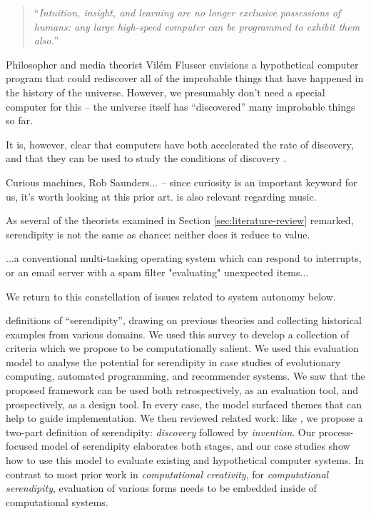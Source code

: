 \begin{quote}
``\emph{Intuition, insight, and learning are no longer exclusive possessions of humans: any large high-speed computer can be programmed to exhibit them also.}'' \cite[p.~6]{simon1958heuristic}
\end{quote}

Philosopher and media theorist Vil\'em Flusser
\cite[p.~10]{flusser2011into} envisions a hypothetical computer
program that could rediscover all of the improbable things that have
happened in the history of the universe.
However, we presumably don't need a special computer for this -- the
universe itself has ``discovered'' many improbable things so far.

It is, however, clear
that computers have both accelerated the rate of discovery, and that
they can be used to study the conditions of discovery
\cite{arbesman2011eurekometrics}.

Curious machines, Rob Saunders... -- since curiosity is an important
keyword for us, it's worth looking at this prior art.
\cite{manaris2003evolutionary} is also relevant regarding music.

As several of the theorists examined in Section
\ref{sec:literature-review} remarked, serendipity is not the same as
chance: neither does it reduce to value.

...a conventional multi-tasking operating system which can respond to interrupts, or an email server with a spam filter "evaluating" unexpected items...



We return to this constellation of issues related to system autonomy
below.


definitions of
``serendipity'', drawing on previous theories and collecting
historical examples from various domains. We used this survey to
develop a collection of criteria which we propose to be
computationally salient.
%
We used this evaluation model to analyse the potential for serendipity in case
studies of evolutionary computing, automated
programming, and recommender systems.  We saw that the proposed framework can be used both
retrospectively, as an evaluation tool, and prospectively, as a design
tool. In every case, the model surfaced themes that can help to guide
implementation.
%
We then reviewed related work: like \citet{andre2009discovery}, we
propose a two-part definition of serendipity: \emph{discovery}
followed by \emph{invention}. Our process-focused model of
serendipity elaborates both stages, and our case studies show how to
use this model to evaluate existing and hypothetical computer systems.
In contrast to most prior work in \emph{computational creativity}, for
\emph{computational serendipity}, evaluation of various forms needs to
be embedded inside of computational systems.

